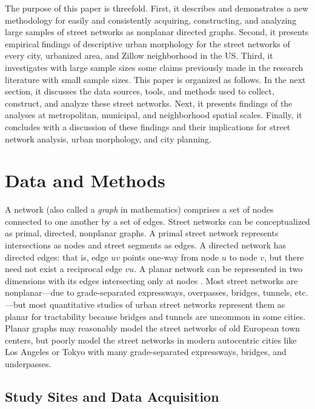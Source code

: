 \documentclass{article}
\begin{document}
The purpose of this paper is threefold. First, it describes and demonstrates a new methodology for easily and consistently acquiring, constructing, and analyzing large samples of street networks as nonplanar directed graphs. Second, it presents empirical findings of descriptive urban morphology for the street networks of every city, urbanized area, and Zillow neighborhood in the US. Third, it investigates with large sample sizes some claims previously made in the research literature with small sample sizes. This paper is organized as follows. In the next section, it discusses the data sources, tools, and methods used to collect, construct, and analyze these street networks. Next, it presents findings of the analyses at metropolitan, municipal, and neighborhood spatial scales. Finally, it concludes with a discussion of these findings and their implications for street network analysis, urban morphology, and city planning.



\section{Data and Methods}

A network (also called a \emph{graph} in mathematics) comprises a set of nodes connected to one another by a set of edges. Street networks can be conceptualized as primal, directed, nonplanar graphs. A primal street network represents intersections as nodes and street segments as edges. A directed network has directed edges: that is, edge $uv$ points one-way from node $u$ to node $v$, but there need not exist a reciprocal edge $vu$. A planar network can be represented in two dimensions with its edges intersecting only at nodes \cite{viana_simplicity_2013, fischer_spatial_2014}. Most street networks are nonplanar---due to grade-separated expressways, overpasses, bridges, tunnels, etc.---but most quantitative studies of urban street networks represent them as planar \cite{buhl_topological_2006, cardillo_structural_2006, barthelemy_modeling_2008, masucci_random_2009, strano_urban_2013} for tractability because bridges and tunnels are uncommon in some cities. Planar graphs may reasonably model the street networks of old European town centers, but poorly model the street networks in modern autocentric cities like Los Angeles or Tokyo with many grade-separated expressways, bridges, and underpasses.

\subsection{Study Sites and Data Acquisition}
\end{document}
